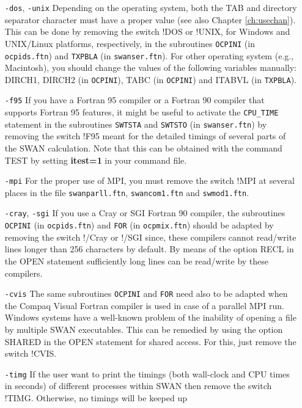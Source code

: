 \documentclass[12pt]{book}
\begin{document}
\begin{itemize}
  \item[{\tt -dos}, {\tt -unix}]
  Depending on the operating system, both the TAB and directory separator character must
  have a proper value (see also Chapter \ref{ch:usechan}). This can be done by removing
  the switch !DOS or !UNIX, for Windows and UNIX/Linux platforms, respectively, in the
  subroutines {\tt OCPINI} (in {\tt ocpids.ftn}) and {\tt TXPBLA} (in {\tt swanser.ftn}).
  For other operating system (e.g., Macintosh), you should change the values of the following
  variables manually: {\scriptsize DIRCH1}, {\scriptsize DIRCH2} (in {\tt OCPINI}),
  {\scriptsize TABC} (in {\tt OCPINI}) and {\scriptsize ITABVL} (in {\tt TXPBLA}).
  \item[{\tt -f95}]
  If you have a Fortran 95 compiler or a Fortran 90 compiler that supports Fortran 95
  features, it might be useful to activate the {\tt CPU\_TIME} statement in the subroutines
  {\tt SWTSTA} and {\tt SWTSTO} (in {\tt swanser.ftn}) by removing the switch !F95 meant for
  the detailed timings of several parts of the SWAN calculation. Note that this can be
  obtained with the command TEST by setting {\bf itest=1} in your command file.
  \item[{\tt -mpi}]
  For the proper use of MPI, you must remove the switch !MPI at several places in the file
  {\tt swanparll.ftn}, {\tt swancom1.ftn} and {\tt swmod1.ftn}.
  \item[{\tt -cray}, {\tt -sgi}]
  If you use a Cray or SGI Fortran 90 compiler, the subroutines {\tt OCPINI} (in {\tt ocpids.ftn})
  and {\tt FOR} (in {\tt ocpmix.ftn}) should be adapted by removing the switch !/Cray or !/SGI since,
  these compilers cannot read/write lines longer than 256 characters by default. By means
  of the option {\scriptsize RECL} in the OPEN statement sufficiently long lines can be
  read/write by these compilers.
  \item[{\tt -cvis}]
  The same subroutines {\tt OCPINI} and {\tt FOR} need also to be adapted when the Compaq Visual
  Fortran compiler is used in case of a parallel MPI run. Windows systems have a well-known problem
  of the inability of opening a file by multiple SWAN executables. This can be remedied by using the
  option {\scriptsize SHARED} in the OPEN statement for shared access. For this, just remove the
  switch !CVIS.
  \item[{\tt -timg}]
  If the user want to print the timings (both wall-clock and CPU times in seconds) of different
  processes within SWAN then remove the switch !TIMG. Otherwise, no timings will be keeped up

\end{itemize}
\end{document}
